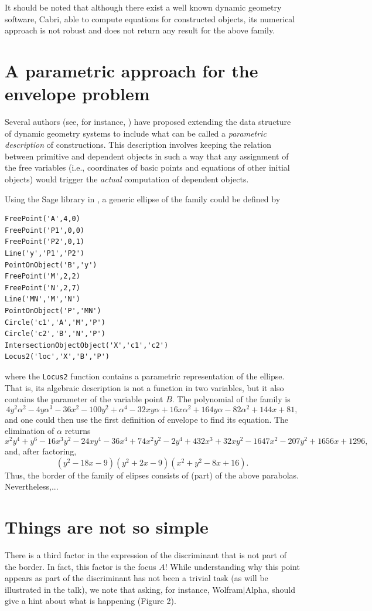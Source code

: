 \documentclass[a4paper]{article} %
\begin{document}
It should be noted that although there exist a well known dynamic geometry software, Cabri, able to compute equations for constructed objects, its numerical approach is 
not robust and does not return any result for the above family.

\section{A parametric approach for the envelope problem}
Several authors (see, for instance, \cite{Botana,Roanes}) have proposed extending the data structure of dynamic geometry systems to include what can be called a 
{\it parametric description} of constructions. This description involves keeping the relation between primitive and dependent objects in such a way that any assignment of the 
free variables (i.e., coordinates of basic points and equations of other initial objects) would trigger the {\it actual} computation of dependent objects.

Using the Sage library in \cite{SageLib}, a generic ellipse of the family could be defined by
\begin{verbatim}
FreePoint('A',4,0)
FreePoint('P1',0,0)
FreePoint('P2',0,1)
Line('y','P1','P2')
PointOnObject('B','y')
FreePoint('M',2,2)
FreePoint('N',2,7)
Line('MN','M','N')
PointOnObject('P','MN')
Circle('c1','A','M','P')
Circle('c2','B','N','P')
IntersectionObjectObject('X','c1','c2')
Locus2('loc','X','B','P')
\end{verbatim}
\noindent where the \verb+Locus2+ function contains a parametric representation of the ellipse. That is, its algebraic description is not a function in two variables, but it also 
contains the parameter of the variable point $B$. The polynomial of the family is
$$4y^2\alpha^2 - 4y\alpha^3 - 36x^2 - 100y^2 + \alpha^4 - 32xy\alpha + 16x\alpha^2 + 164y\alpha - 82\alpha^2 + 144x + 81,$$
and one could then use the first definition of envelope to find its equation. The elimination of $\alpha$ returns
$$x^2y^4 + y^6 - 16x^3y^2 - 24xy^4 - 36x^4 + 74x^2y^2 - 2y^4 + 432x^3 + 32xy^2 - 1647x^2 - 207y^2 + 1656x + 1296,$$
and, after factoring,
$$(y^2 - 18x - 9)(y^2 + 2x - 9)(x^2 + y^2 -8x + 16).$$
\noindent Thus, the border of the family of elipses consists of (part) of the above parabolas. Nevertheless,...

\section{Things are not so simple}
There is a third factor in the expression of the discriminant that is not part of the border. In fact, this factor is the focus $A$! While understanding why this point appears as 
part of the discriminant has not been a trivial task (as will be illustrated in the talk), we note that asking, for instance, Wolfram$|$Alpha, should give a hint about 
what is happening (Figure 2).
\end{document}
